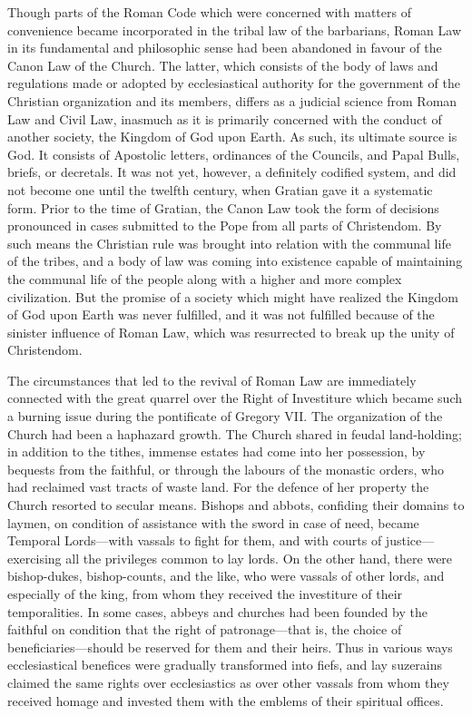 \documentclass{book}
\begin{document}
Though parts of the Roman Code which were concerned with matters of convenience became incorporated in the tribal law of the barbarians, Roman Law in its fundamental and philosophic sense had been abandoned in favour of the Canon Law of the Church. The latter, which consists of the body of laws and regulations made or adopted by ecclesiastical authority for the government of the Christian organization and its members, differs as a judicial science from Roman Law and Civil Law, inasmuch as it is primarily concerned with the conduct of another society, the Kingdom of God upon Earth. As such, its ultimate source is God. It consists of Apostolic letters, ordinances of the Councils, and Papal Bulls, briefs, or decretals. It was not yet, however, a definitely codified system, and did not become one until the twelfth century, when Gratian gave it a systematic form. Prior to the time of Gratian, the Canon Law took the form of decisions pronounced in cases submitted to the Pope from all parts of Christendom. By such means the Christian rule was brought into relation with the communal life of the tribes, and a body of law was coming into existence capable of maintaining the communal life of the people along with a higher and more complex civilization. But the promise of a society which might have realized the Kingdom of God upon Earth was never fulfilled, and it was not fulfilled because of the sinister influence of Roman Law, which was resurrected to break up the unity of Christendom.

The circumstances that led to the revival of Roman Law are immediately connected with the great quarrel over the Right of Investiture which became such a burning issue during the pontificate of Gregory VII. The organization of the Church had been a haphazard growth. The Church shared in feudal land-holding; in addition to the tithes, immense estates had come into her possession, by bequests from the faithful, or through the labours of the monastic orders, who had reclaimed vast tracts of waste land. For the defence of her property the Church resorted to secular means. Bishops and abbots, confiding their domains to laymen, on condition of assistance with the sword in case of need, became Temporal Lords—with vassals to fight for them, and with courts of justice—exercising all the privileges common to lay lords. On the other hand, there were bishop-dukes, bishop-counts, and the like, who were vassals of other lords, and especially of the king, from whom they received the investiture of their temporalities. In some cases, abbeys and churches had been founded by the faithful on condition that the right of patronage—that is, the choice of beneficiaries—should be reserved for them and their heirs. Thus in various ways ecclesiastical benefices were gradually transformed into fiefs, and lay suzerains claimed the same rights over ecclesiastics as over other vassals from whom they received homage and invested them with the emblems of their spiritual offices.
\end{document}
